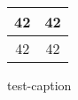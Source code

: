 \documentclass{article}
\begin{document}
\begin{figure}[t]
    \centering
\begin{tabular}{|| c | c ||}
\hline
\hline
  42 & 42 \\
\hline
  42 & 42 \\
\hline
\hline
\end{tabular}
  \caption{test-caption}
  \label{fig:test-label}
\end{figure}
\end{document}
